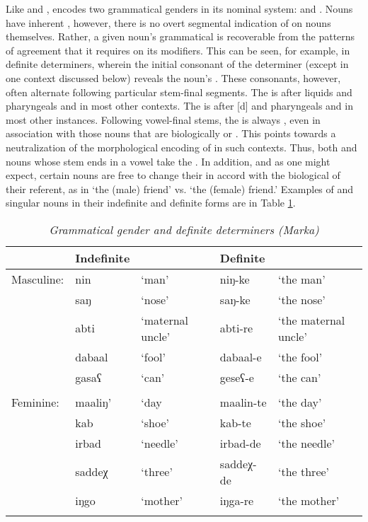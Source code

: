 \documentclass[output=paper]{../langsci/langscibook}
\begin{document}
 Like  and ,  encodes two grammatical genders in its nominal system:  and . Nouns have inherent , however, there is no overt segmental indication of  on nouns themselves. Rather, a given noun's grammatical  is recoverable from the patterns of agreement that it requires on its modifiers. This can be seen, for example, in definite determiners, wherein the initial consonant of the determiner (except in one context discussed below) reveals the noun's . These consonants, however, often alternate following particular stem-final segments. The   is  after liquids and pharyngeals and  in most other contexts. The   is  after [d] and pharyngeals and  in most other instances. Following vowel-final stems, the  is always , even in association with those nouns that are biologically  or . This points towards a neutralization of the morphological encoding of  in such contexts. Thus, both  and  nouns whose stem ends in a vowel take the  . In addition, and as one might expect, certain nouns are free to change their  in accord with the biological  of their referent, as in  `the (male) friend' vs.  `the (female) friend.' Examples of   and  singular nouns in their indefinite and definite forms are in Table \ref{tab:1:Grammatical Gender}.
 
\vspace{6pt}

\begin{table}
 	\caption{\textit{Grammatical gender and definite determiners (Marka)}}
 	\label{tab:1:Grammatical Gender}
 	\begin{tabular}{lllll} 
 		\lsptoprule
 		 & Indefinite  &  & Definite &  \\ 
 		\midrule
 		Masculine: & nin & `man' & niŋ-ke & `the man' \\
 		 & saŋ  &   `nose' & saŋ-ke & `the nose' \\
 		 & abti & `maternal uncle' & abti-re & `the maternal uncle'  \\
 		 & dabaal & `fool' & dabaal-e & `the fool' \\
 		  & gasaʕ & `can' & geseʕ-e & `the can'\\
 		&&&&\\
 		Feminine: & maaliŋ' & `day & maalin-te & `the day' \\
 		 & kab & `shoe' & kab-te & `the shoe' \\
 		 & irbad & `needle' & irbad-de & `the needle' \\
 		  & saddeχ & `three' & saddeχ-de & `the three' \\
	 	& iŋgo & `mother' & iŋga-re & `the mother' \\
 		\lspbottomrule
 	\end{tabular}
 \end{table}
 
\end{document}
